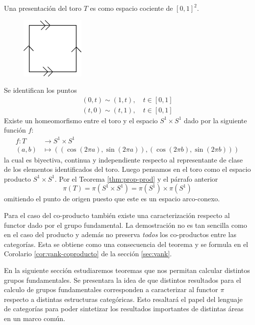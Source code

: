 \begin{ejemplo}[Toro] \label{ej:toro-presentacion}
  Una presentación del toro \(T\) es como espacio cociente de
  \([0,1]^2\).
  \begin{figure}[h]
    \centering \includegraphics[scale=0.5]{./imagenes/toro.png}
  \end{figure}
  Se identifican los puntos
  \begin{gather*}
    (0,t) \sim (1,t), \quad t \in [0,1] \\
    (t,0) \sim (t,1), \quad t \in [0,1]
  \end{gather*}
  Existe un homeomorfismo entre el toro y el espacio \(S^1 \times S^1\)
  dado por la siguiente función \(f\):
  \begin{align*}
    f : T &\longrightarrow S^1 \times S^1 \\
    (a,b) &\longmapsto \left( \left( \cos (2 \pi a) , \sin (2 \pi a) \right), \left( \cos (2 \pi b) , \sin (2 \pi b) \right) \right)
  \end{align*}
  la cual es biyectiva, continua y independiente respecto al
  representante de clase de los elementos identificados del toro. Luego
  pensamos en el toro como el espacio producto \(S^1 \times S^1\). Por
  el Teorema \ref{thm:prop-prod} y el párrafo anterior
  \[
    \pi \left( T \right) = \pi \left( S^1 \times S^1 \right) = \pi (S^1)
    \times \pi (S^1)
  \]
  omitiendo el punto de origen puesto que este es un espacio
  arco-conexo.
\end{ejemplo}

Para el caso del co-producto también existe una caracterización respecto
al functor dado por el grupo fundamental. La demostración no es tan
sencilla como en el caso del producto y además no preserva \emph{todos}
los co-productos entre las categorías. Esta se obtiene como una consecuencia
del teorema \vank y se formula en el Corolario \ref{cor:vank-coproducto} de
la sección \ref{sec:vank}.

En la siguiente sección estudiaremos teoremas que nos permitan calcular
distintos grupos fundamentales. Se presentara la idea de que distintos
resultados para el calculo de grupos fundamentales corresponden a
caracterizar al functor \(\pi\) respecto a distintas estructuras
categóricas. Esto resaltará el papel del lenguaje de categorías para
poder sintetizar los resultados importantes de distintas áreas en un
marco común.
